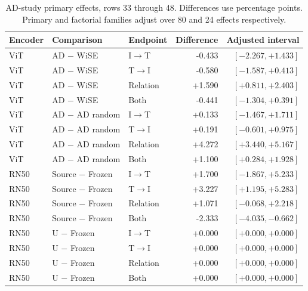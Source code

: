 \begin{table}[t]
\centering
\small
\setlength{\tabcolsep}{3pt}
\begin{tabular}{lllrr}
\toprule
Encoder & Comparison & Endpoint & Difference & Adjusted interval\\
\midrule
ViT & AD $-$ WiSE & I$\to$T & -0.433 & $[-2.267,+1.433]$ \\
ViT & AD $-$ WiSE & T$\to$I & -0.580 & $[-1.587,+0.413]$ \\
ViT & AD $-$ WiSE & Relation & +1.590 & $[+0.811,+2.403]$ \\
ViT & AD $-$ WiSE & Both & -0.441 & $[-1.304,+0.391]$ \\
ViT & AD $-$ AD random & I$\to$T & +0.133 & $[-1.467,+1.711]$ \\
ViT & AD $-$ AD random & T$\to$I & +0.191 & $[-0.601,+0.975]$ \\
ViT & AD $-$ AD random & Relation & +4.272 & $[+3.440,+5.167]$ \\
ViT & AD $-$ AD random & Both & +1.100 & $[+0.284,+1.928]$ \\
RN50 & Source $-$ Frozen & I$\to$T & +1.700 & $[-1.867,+5.233]$ \\
RN50 & Source $-$ Frozen & T$\to$I & +3.227 & $[+1.195,+5.283]$ \\
RN50 & Source $-$ Frozen & Relation & +1.071 & $[-0.068,+2.218]$ \\
RN50 & Source $-$ Frozen & Both & -2.333 & $[-4.035,-0.662]$ \\
RN50 & U $-$ Frozen & I$\to$T & +0.000 & $[+0.000,+0.000]$ \\
RN50 & U $-$ Frozen & T$\to$I & +0.000 & $[+0.000,+0.000]$ \\
RN50 & U $-$ Frozen & Relation & +0.000 & $[+0.000,+0.000]$ \\
RN50 & U $-$ Frozen & Both & +0.000 & $[+0.000,+0.000]$ \\
\bottomrule
\end{tabular}
\caption{AD-study primary effects, rows 33 through 48. Differences use percentage points. Primary and factorial families adjust over 80 and 24 effects respectively.}\label{tab:adprimary32}
\end{table}


